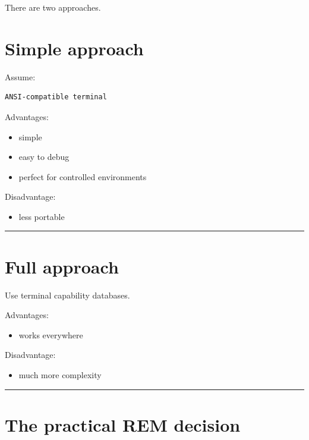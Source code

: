 \documentclass[
  oneside,
  openany]{book}
\providecommand{\tightlist}{%
  \setlength{\itemsep}{0pt}\setlength{\parskip}{0pt}}
\begin{document}
There are two approaches.

\hypertarget{simple-approach}{%
\section{Simple approach}\label{simple-approach}}

Assume:

\begin{verbatim}
ANSI-compatible terminal
\end{verbatim}

Advantages:

\begin{itemize}
\tightlist
\item
  simple
\item
  easy to debug
\item
  perfect for controlled environments
\end{itemize}

Disadvantage:

\begin{itemize}
\tightlist
\item
  less portable
\end{itemize}

\begin{center}\rule{0.5\linewidth}{0.5pt}\end{center}

\hypertarget{full-approach}{%
\section{Full approach}\label{full-approach}}

Use terminal capability databases.

Advantages:

\begin{itemize}
\tightlist
\item
  works everywhere
\end{itemize}

Disadvantage:

\begin{itemize}
\tightlist
\item
  much more complexity
\end{itemize}

\begin{center}\rule{0.5\linewidth}{0.5pt}\end{center}

\hypertarget{the-practical-rem-decision}{%
\section{The practical REM decision}\label{the-practical-rem-decision}}
\end{document}
